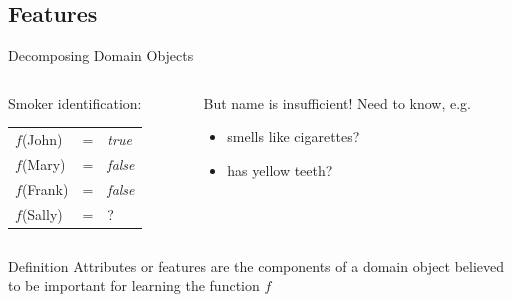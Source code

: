 \documentclass[14pt]{beamer}
\begin{document}
\subsection{Features}

\begin{frame}{Decomposing Domain Objects}
\begin{columns}
\begin{column}{1.6in}
Smoker identification: \\
\smallskip
\begin{tabular}{lll}
$f$(John)  & = & \textit{true} \\
$f$(Mary)  & = & \textit{false} \\
$f$(Frank) & = & \textit{false} \\
$f$(Sally) & = & ?
\end{tabular}
\end{column}
\pause
\begin{column}{2.6in}
\begin{block}{But name is insufficient!}
Need to know, e.g.
\begin{itemize}
\item smells like cigarettes?
\item has yellow teeth?
\end{itemize}
\end{block}
\end{column}
\end{columns}
\bigskip
\pause
\begin{block}{Definition}
\alert{Attributes} or \alert{features} are the components of a domain object believed to be important for learning the function $f$
\end{block}
\end{frame}
\end{document}
